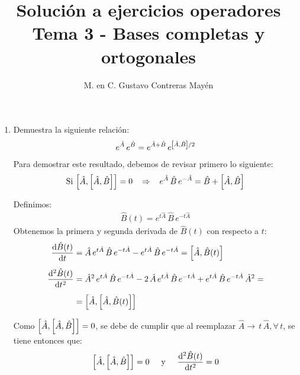 
\title{Solución a ejercicios operadores \\ \large {Tema 3 - Bases completas y ortogonales} \vspace{-3ex}}
\author{M. en C. Gustavo Contreras Mayén}
\date{ }

\vspace{-4cm}
\maketitle
\fontsize{14}{14}\selectfont


\begin{enumerate}
\item Demuestra la siguiente relación:
\begin{align*}
e^{\hat{A}} \, e^{\hat{B}} = e^{\hat{A} + \hat{B}} \, e^{\comm{\hat{A}}{\hat{B}}/2} 
\end{align*}
Para demostrar este resultado, debemos de revisar primero lo siguiente:
\begin{align*}
\mbox{Si } \comm{\hat{A}}{\comm{\hat{A}}{\hat{B}}} = 0 \hspace{0.3cm} \Rightarrow \hspace{0.3cm} e^{\hat{A}} \, \hat{B} \, e^{-\hat{A}} = \hat{B} + \comm{\hat{A}}{\hat{B}}
\end{align*}

Definimos:
\begin{align*}
\hat{B}(t) = e^{t \hat{A}} \, \hat{B} \, e^{-t \hat{A}}
\end{align*}
Obtenemos la primera y segunda derivada de $\hat{B}(t)$ con respecto a $t$:
\begin{align*}
\dv{\hat{B}(t)}{t} &= \hat{A} \, e^{t \hat{A}} \, \hat{B} \, e^{-t \hat{A}} - e^{t \hat{A}} \, \hat{B} \, e^{-t \hat{A}} = \comm{\hat{A}}{\hat{B}(t)} \\[0.5em]
\dv[2]{\hat{B}(t)}{t} &= \hat{A}^{2} \, e^{t \hat{A}} \, \hat{B} \, e^{-t \hat{A}} - 2 \, \hat{A} \, e^{t \hat{A}} \, \hat{B} \, e^{-t \hat{A}} + e^{t \hat{A}} \, \hat{B} \, e^{-t \hat{A}} \, \hat{A}^{2} = \\[0.5em]
&= \comm{\hat{A}}{\comm{\hat{A}}{\hat{B}(t)}}
\end{align*}

Como $\comm{\hat{A}}{\comm{\hat{A}}{\hat{B}}} = 0$, se debe de cumplir que al reemplazar \hfill \break $\hat{A} \to \, t \, \hat{A}, \forall \, t$, se tiene entonces que:
\begin{align*}
\comm{\hat{A}}{\comm{\hat{A}}{\hat{B}}} = 0 \hspace{0.5cm} \mbox{y} \hspace{0.5cm} \dv[2]{\hat{B}(t)}{t} = 0
\end{align*}


\end{enumerate}

